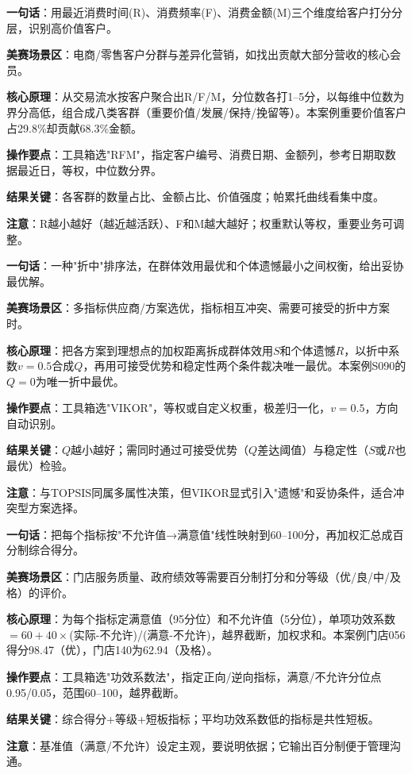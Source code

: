 \begin{algobrief}
\textbf{一句话}：用最近消费时间(R)、消费频率(F)、消费金额(M)三个维度给客户打分分层，识别高价值客户。

\textbf{美赛场景区}：电商/零售客户分群与差异化营销，如找出贡献大部分营收的核心会员。

\textbf{核心原理}：从交易流水按客户聚合出R/F/M，分位数各打1--5分，以每维中位数为界分高低，组合成八类客群（重要价值/发展/保持/挽留等）。本案例重要价值客户占29.8\%却贡献68.3\%金额。

\textbf{操作要点}：工具箱选"RFM"，指定客户编号、消费日期、金额列，参考日期取数据最近日，等权，中位数分界。

\textbf{结果关键}：各客群的数量占比、金额占比、价值强度；帕累托曲线看集中度。

\textbf{注意}：R越小越好（越近越活跃）、F和M越大越好；权重默认等权，重要业务可调整。
\end{algobrief}


\begin{algobrief}
\textbf{一句话}：一种"折中"排序法，在群体效用最优和个体遗憾最小之间权衡，给出妥协最优解。

\textbf{美赛场景区}：多指标供应商/方案选优，指标相互冲突、需要可接受的折中方案时。

\textbf{核心原理}：把各方案到理想点的加权距离拆成群体效用$S$和个体遗憾$R$，以折中系数$v=0.5$合成$Q$，再用可接受优势和稳定性两个条件裁决唯一最优。本案例S090的$Q=0$为唯一折中最优。

\textbf{操作要点}：工具箱选"VIKOR"，等权或自定义权重，极差归一化，$v=0.5$，方向自动识别。

\textbf{结果关键}：$Q$越小越好；需同时通过可接受优势（$Q$差达阈值）与稳定性（$S$或$R$也最优）检验。

\textbf{注意}：与TOPSIS同属多属性决策，但VIKOR显式引入"遗憾"和妥协条件，适合冲突型方案选择。
\end{algobrief}


\begin{algobrief}
\textbf{一句话}：把每个指标按"不允许值→满意值"线性映射到60--100分，再加权汇总成百分制综合得分。

\textbf{美赛场景区}：门店服务质量、政府绩效等需要百分制打分和分等级（优/良/中/及格）的评价。

\textbf{核心原理}：为每个指标定满意值（95分位）和不允许值（5分位），单项功效系数$=60+40\times$(实际-不允许)/(满意-不允许)，越界截断，加权求和。本案例门店056得分98.47（优），门店140为62.94（及格）。

\textbf{操作要点}：工具箱选"功效系数法"，指定正向/逆向指标，满意/不允许分位点0.95/0.05，范围60--100，越界截断。

\textbf{结果关键}：综合得分+等级+短板指标；平均功效系数低的指标是共性短板。

\textbf{注意}：基准值（满意/不允许）设定主观，要说明依据；它输出百分制便于管理沟通。
\end{algobrief}

